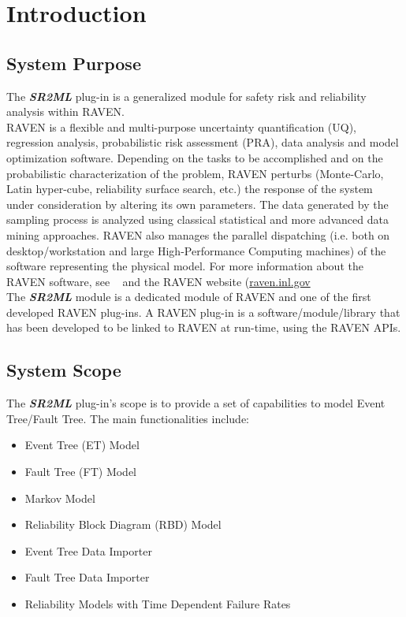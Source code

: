 \section{Introduction}
\subsection{System Purpose}

The \textbf{\textit{SR2ML}} plug-in is a generalized module for safety risk and reliability analysis within RAVEN.
\\RAVEN is a flexible and multi-purpose uncertainty quantification (UQ), regression analysis, probabilistic risk assessment
(PRA), data analysis and model optimization software.  Depending on the tasks to be accomplished and on the
probabilistic
 characterization of the problem, RAVEN perturbs (Monte-Carlo, Latin hyper-cube, reliability surface search, etc.) the
 response of the system under consideration by altering its own parameters.
 The data generated by the sampling process is analyzed using classical statistical
 and more advanced data mining approaches. RAVEN also manages the parallel dispatching (i.e. both on
 desktop/workstation and large High-Performance Computing machines) of the software representing the physical
 model.
 For more information about the RAVEN software, see ~\cite{RAVENuserManual} and the RAVEN website (\url{raven.inl.gov}
\\The  \textbf{\textit{SR2ML}} module is a dedicated module of RAVEN and one of the first developed RAVEN plug-ins.
A RAVEN plug-in is a software/module/library that has been developed to be linked to RAVEN at run-time, using the RAVEN APIs.


\subsection{System Scope}

The \textbf{\textit{SR2ML}} plug-in’s scope is to provide a set of capabilities to model Event Tree/Fault Tree. The main functionalities
include:
\begin{itemize}
  \item Event Tree (ET) Model
  \item Fault Tree (FT) Model
  \item Markov Model
  \item Reliability Block Diagram (RBD) Model
  \item Event Tree Data Importer
  \item Fault Tree Data Importer
  \item Reliability Models with Time Dependent Failure Rates
\end{itemize}


